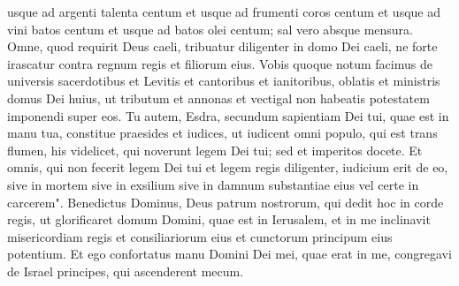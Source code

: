 \begin{biblechapter}
\verse usque ad argenti talenta centum et usque ad frumenti coros centum et usque ad vini batos centum et usque ad batos olei centum; sal vero absque mensura. 
\verse Omne, quod requirit Deus caeli, tribuatur diligenter in domo Dei caeli, ne forte irascatur contra regnum regis et filiorum eius. 
\verse Vobis quoque notum facimus de universis sacerdotibus et Levitis et cantoribus et ianitoribus, oblatis et ministris domus Dei huius, ut tributum et annonas et vectigal non habeatis potestatem imponendi super eos. 
\verse Tu autem, Esdra, secundum sapientiam Dei tui, quae est in manu tua, constitue praesides et iudices, ut iudicent omni populo, qui est trans flumen, his videlicet, qui noverunt legem Dei tui; sed et imperitos docete. 
\verse Et omnis, qui non fecerit legem Dei tui et legem regis diligenter, iudicium erit de eo, sive in mortem sive in exsilium sive in damnum substantiae eius vel certe in carcerem". 
\verse Benedictus Dominus, Deus patrum nostrorum, qui dedit hoc in corde regis, ut glorificaret domum Domini, quae est in Ierusalem, 
\verse et in me inclinavit misericordiam regis et consiliariorum eius et cunctorum principum eius potentium. Et ego confortatus manu Domini Dei mei, quae erat in me, congregavi de Israel principes, qui ascenderent mecum. 
\end{biblechapter}

